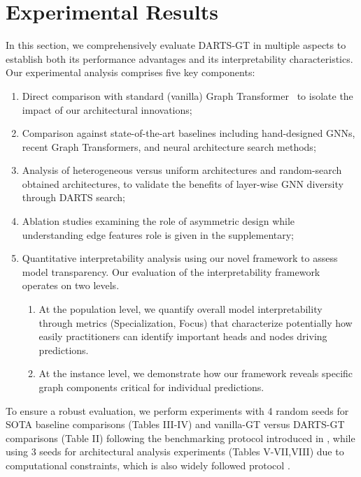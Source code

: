 \documentclass[lettersize,journal]{IEEEtran}
\begin{document}
\section{Experimental Results}

In this section, we comprehensively evaluate DARTS-GT in multiple aspects to establish both its performance advantages and its interpretability characteristics. Our experimental analysis comprises five key components: 
\begin{enumerate}
\item Direct comparison with standard (vanilla) Graph Transformer~\cite{dwivedi_generalization_2021} to isolate the impact of our architectural innovations; 
\item Comparison against state-of-the-art baselines including hand-designed GNNs, recent Graph Transformers, and neural architecture search methods;   
\item Analysis of heterogeneous versus uniform architectures and random-search obtained architectures, to validate the benefits of layer-wise GNN diversity through DARTS search; 
\item Ablation studies examining the role of asymmetric design while understanding edge features role is given in the supplementary; 
\item Quantitative interpretability analysis using our novel framework to assess model transparency. Our evaluation of the interpretability framework operates on two levels.
    \begin{enumerate}
        \item  At the population level, we quantify overall model interpretability through metrics (Specialization, Focus) that characterize potentially how easily practitioners can identify important heads and nodes driving predictions. 
        \item  At the instance level, we demonstrate how our framework reveals specific graph components critical for individual predictions.
    \end{enumerate}
\end{enumerate}

To ensure a robust evaluation, we perform experiments with 4 random seeds for SOTA baseline comparisons (Tables III-IV) and vanilla-GT versus DARTS-GT comparisons (Table II) following the benchmarking protocol introduced in \cite{dwivedi_benchmarking_2022}, while using 3 seeds for architectural analysis experiments (Tables V-VII,VIII) due to computational constraints, which is also widely followed protocol \cite{rampa_recipe_nodate}. 
\end{document}
